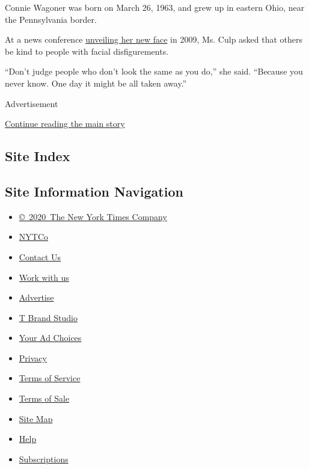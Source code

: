 Connie Wagoner was born on March 26, 1963, and grew up in eastern Ohio,
near the Pennsylvania border.

At a news conference
\href{https://www.nytimes3xbfgragh.onion/2009/05/06/science/06face.html}{unveiling
her new face} in 2009, Ms. Culp asked that others be kind to people with
facial disfigurements.

``Don't judge people who don't look the same as you do,'' she said.
``Because you never know. One day it might be all taken away.''

Advertisement

\protect\hyperlink{after-bottom}{Continue reading the main story}

\hypertarget{site-index}{%
\subsection{Site Index}\label{site-index}}

\hypertarget{site-information-navigation}{%
\subsection{Site Information
Navigation}\label{site-information-navigation}}

\begin{itemize}
\tightlist
\item
  \href{https://help.nytimes3xbfgragh.onion/hc/en-us/articles/115014792127-Copyright-notice}{©~2020~The
  New York Times Company}
\end{itemize}

\begin{itemize}
\tightlist
\item
  \href{https://www.nytco.com/}{NYTCo}
\item
  \href{https://help.nytimes3xbfgragh.onion/hc/en-us/articles/115015385887-Contact-Us}{Contact
  Us}
\item
  \href{https://www.nytco.com/careers/}{Work with us}
\item
  \href{https://nytmediakit.com/}{Advertise}
\item
  \href{http://www.tbrandstudio.com/}{T Brand Studio}
\item
  \href{https://www.nytimes3xbfgragh.onion/privacy/cookie-policy\#how-do-i-manage-trackers}{Your
  Ad Choices}
\item
  \href{https://www.nytimes3xbfgragh.onion/privacy}{Privacy}
\item
  \href{https://help.nytimes3xbfgragh.onion/hc/en-us/articles/115014893428-Terms-of-service}{Terms
  of Service}
\item
  \href{https://help.nytimes3xbfgragh.onion/hc/en-us/articles/115014893968-Terms-of-sale}{Terms
  of Sale}
\item
  \href{https://spiderbites.nytimes3xbfgragh.onion}{Site Map}
\item
  \href{https://help.nytimes3xbfgragh.onion/hc/en-us}{Help}
\item
  \href{https://www.nytimes3xbfgragh.onion/subscription?campaignId=37WXW}{Subscriptions}
\end{itemize}
